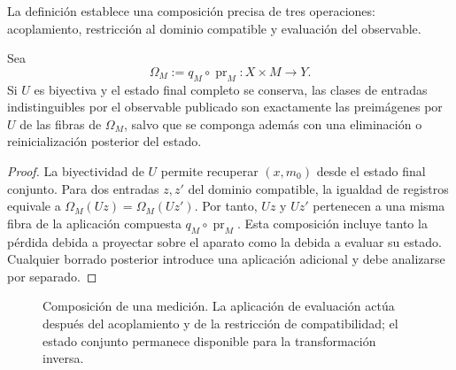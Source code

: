 La definición establece una composición precisa de tres operaciones:
acoplamiento, restricción al dominio compatible y evaluación del observable.

\begin{theorem}
Sea
\[
 \Omega_M:=q_M\circ\operatorname{pr}_M:X\times M\longrightarrow Y.
\]
Si \(U\) es biyectiva y el estado final completo se conserva, las clases de
entradas indistinguibles por el observable publicado son exactamente las
preimágenes por \(U\) de las fibras de \(\Omega_M\), salvo que se componga
además con una eliminación o reinicialización posterior del estado.
\end{theorem}
\begin{proof}
La biyectividad de \(U\) permite recuperar \((x,m_0)\) desde el estado final
conjunto. Para dos entradas \(z,z'\) del dominio compatible, la igualdad de
registros equivale a
\(\Omega_M(Uz)=\Omega_M(Uz')\). Por tanto, \(Uz\) y \(Uz'\) pertenecen a una
misma fibra de la aplicación compuesta \(q_M\circ\operatorname{pr}_M\). Esta
composición incluye tanto la pérdida debida a proyectar sobre el aparato como
la debida a evaluar su estado. Cualquier borrado posterior introduce una
aplicación adicional y debe analizarse por separado.
\end{proof}

\begin{figure}[htbp]
\centering
{}
\caption{Composición de una medición. La aplicación de evaluación actúa
después del acoplamiento y de la restricción de compatibilidad; el estado
conjunto permanece disponible para la transformación inversa.}
\label{p12-83-c16-s1:fig:medicion}
\end{figure}

